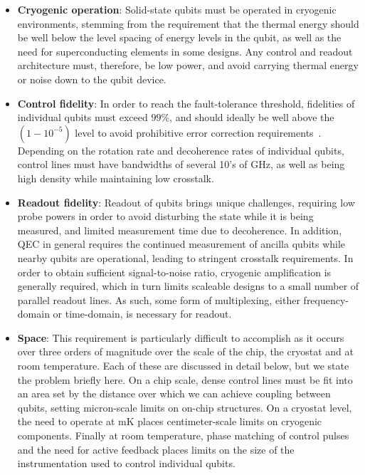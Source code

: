 \begin{itemize}
  \item \textbf{Cryogenic operation}: Solid-state qubits must be operated in cryogenic environments, stemming from the requirement that the thermal energy should be well below the level spacing of energy levels in the qubit, as well as the need for superconducting elements in some designs. Any control and readout architecture must, therefore, be low power, and avoid carrying thermal energy or noise down to the qubit device.
  \item \textbf{Control fidelity}: In order to reach the fault-tolerance threshold, fidelities of individual qubits must exceed $99\%$, and should ideally be well above the $(1 - 10^{-5})$ level to avoid prohibitive error correction requirements~\cite{6657074}. Depending on the rotation rate and decoherence rates of individual qubits, control lines must have bandwidths of several 10's of \si{\giga\hertz}, as well as being high density while maintaining low crosstalk.
  \item \textbf{Readout fidelity}: Readout of qubits brings unique challenges, requiring low probe powers in order to avoid disturbing the state while it is being measured, and limited measurement time due to decoherence. In addition, QEC in general requires the continued measurement of ancilla qubits while nearby qubits are operational, leading to stringent crosstalk requirements. In order to obtain sufficient signal-to-noise ratio, cryogenic amplification is generally required, which in turn limits scaleable designs to a small number of parallel readout lines. As such, some form of multiplexing, either frequency-domain or time-domain, is necessary for readout.
  \item \textbf{Space}: This requirement is particularly difficult to accomplish as it occurs over three orders of magnitude over the scale of the chip, the cryostat and at room temperature. Each of these are discussed in detail below, but we state the problem briefly here. On a chip scale, dense control lines must be fit into an area set by the distance over which we can achieve coupling between qubits, setting micron-scale limits on on-chip structures. On a cryostat level, the need to operate at \si{\milli\kelvin} places centimeter-scale limits on cryogenic components. Finally at room temperature, phase matching of control pulses and the need for active feedback places limits on the size of the instrumentation used to control individual qubits.
\end{itemize}

